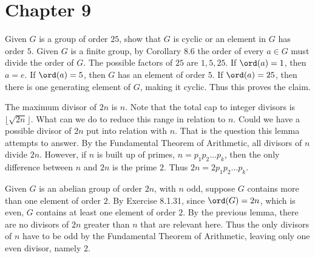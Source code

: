 
\section{Chapter 9}

\begin{problem}[Exercise 1]{
    Given $G$ is a group of order $25$, show that $G$ is cyclic or an element in $G$ has order $5$.
}
    Given $G$ is a finite group, by Corollary 8.6 the order of every $a \in G$ must divide the order of $G$.
    The possible factors of $25$ are $1,5,25$.
    If $\ord(a) = 1$, then $a = e$.
    If $\ord(a) = 5$, then $G$ has an element of order $5$.
    If $\ord(a) = 25$, then there is one generating element of $G$, making it cyclic.
    Thus this proves the claim.
\end{problem}

\begin{lemma}{
    The maximum divisor of $2n$ is $n$.
}
    Note that the total cap to integer divisors is $\lfloor \sqrt{2n} \rfloor$.
    What can we do to reduce this range in relation to $n$.
    Could we have a possible divisor of $2n$ put into relation with $n$.
    That is the question this lemma attempts to answer.
    By the Fundamental Theorem of Arithmetic, all divisors of $n$ divide $2n$.
    However, if $n$ is built up of primes, $n = p_1 p_2 \dots p_k$, then the only difference between $n$ and $2n$ is the prime $2$.
    Thus $2n = 2p_1 p_2 \dots p_k$.
\end{lemma}

\begin{problem}[Exercise 2]{
    Given $G$ is an abelian group of order $2n$, with $n$ odd, suppose $G$ contains more than one element of order $2$.
}
    By Exercise 8.1.31, since $\ord(G) = 2n$, which is even, $G$ contains at least one element of order $2$.
    By the previous lemma, there are no divisors of $2n$ greater than $n$ that are relevant here.
    Thus the only divisors of $n$ have to be odd by the Fundamental Theorem of Arithmetic, leaving only one even divisor, namely $2$.
\end{problem}

